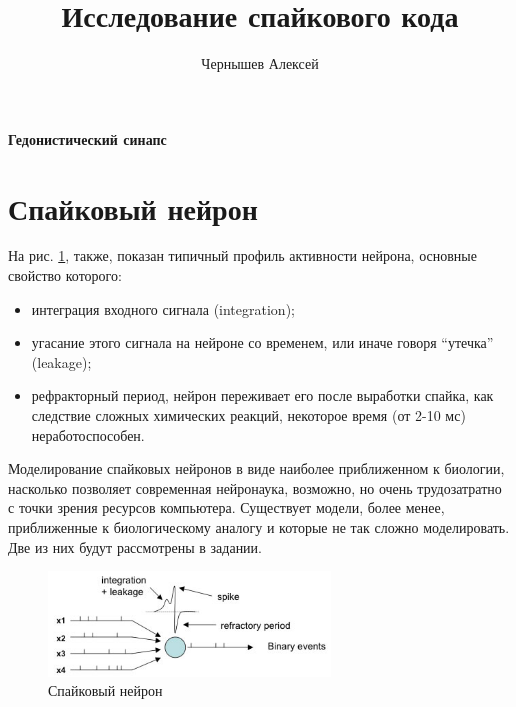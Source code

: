 \documentclass[a4paper,10pt,usenames]{article}
\title{Исследование спайкового кода}
\author{Чернышев Алексей}
\begin{document}
{ \huge \bfseries Гедонистический синапс\\[0.4cm] }


\tableofcontents
\clearpage
\section{Спайковый нейрон}
\indent На рис. \ref{spiking_neuron_pic}, также, показан типичный профиль активности нейрона, основные свойство которого: 
\begin{itemize}
\item интеграция входного сигнала (integration);
\item угасание этого сигнала на нейроне со временем, или иначе говоря ``утечка'' (leakage);
\item рефракторный период, нейрон переживает его после выработки спайка, как следствие сложных химических реакций, некоторое время (от 2-10 мс) неработоспособен.
\end{itemize}
\indent Моделирование спайковых нейронов в виде наиболее приближенном к биологии, насколько позволяет современная нейронаука, возможно, но очень трудозатратно с точки зрения ресурсов компьютера. Существует модели, более менее, приближенные к биологическому аналогу и которые не так сложно моделировать. Две из них будут рассмотрены в задании.
\begin{figure}[ht]
\centering
\captionsetup{justification=centering,margin=1cm}
\includegraphics[width=75mm,scale=0.7]{spiking_neuron.jpg}
\caption{Спайковый нейрон}
\label{spiking_neuron_pic}
\end{figure}\\
\end{document}
